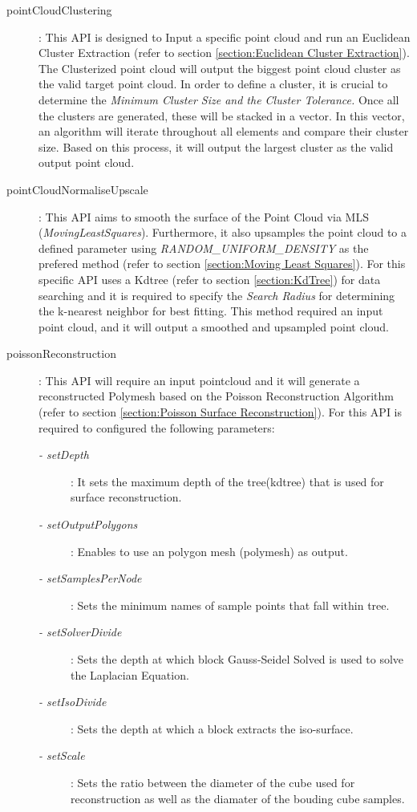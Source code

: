 \documentclass[12pt]{report}
\begin{document}
\begin{description}
  \item[pointCloudClustering]: This API is designed to Input a specific point cloud and run an Euclidean Cluster Extraction (refer to section \ref{section:Euclidean Cluster Extraction}). The Clusterized point cloud will output the biggest point cloud cluster as the valid target point cloud.
   In order to define a cluster, it is crucial to determine the \textit{Minimum Cluster Size and the Cluster Tolerance.} Once all the clusters are generated, these will be stacked in a vector. 
   In this vector, an algorithm will iterate throughout all elements and compare their cluster size. Based on this process, it will output the largest cluster as the valid output point cloud.
   \item[pointCloudNormaliseUpscale]: This API aims to smooth the surface of the Point Cloud via MLS (\textit{MovingLeastSquares}). 
   Furthermore, it also upsamples the point cloud to a defined parameter using \textit{RANDOM\_UNIFORM\_DENSITY} as the prefered method (refer to section \ref{section:Moving Least Squares}). 
   For this specific API uses a Kdtree (refer to section \ref{section:KdTree}) for data searching and it is required to specify the \textit{Search Radius} for determining the k-nearest neighbor for best fitting. 
   This method required an input point cloud, and it will output a smoothed and upsampled point cloud.
   \item[poissonReconstruction]: This API will require an input pointcloud and it will generate a reconstructed Polymesh based on the Poisson Reconstruction Algorithm (refer to section \ref{section:Poisson Surface Reconstruction}).
   For this API is required to configured the following parameters:
   \begin{description}
     \item[\textit{- setDepth}]: It sets the maximum depth of the tree(kdtree) that is used for surface reconstruction. 
     \item[\textit{- setOutputPolygons}] : Enables to use an polygon mesh (polymesh) as output.
     \item[\textit{- setSamplesPerNode}] : Sets the minimum names of sample points that fall within tree.
     \item[\textit{- setSolverDivide}] : Sets the depth at which block Gauss-Seidel Solved is used to solve the Laplacian Equation.
     \item[\textit{- setIsoDivide}] : Sets the depth at which a block extracts the iso-surface.
     \item[\textit{- setScale}] : Sets the ratio between the diameter of the cube used for reconstruction as well as the diamater of the bouding cube samples.
   \end{description}


\end{description}
\end{document}
